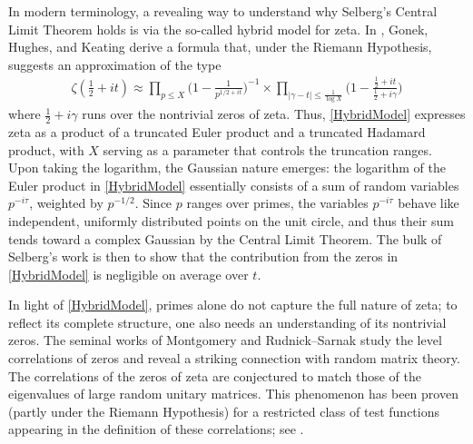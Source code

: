 \documentclass[12pt,oneside,english,a4paper]{amsart}
\theoremstyle{remark}
\numberwithin{equation}{section}
\begin{document}
In modern terminology, a revealing way to understand why Selberg's Central Limit Theorem holds is via the so-called hybrid model for zeta. In \cite{GonekHughesKeating}, Gonek, Hughes, and Keating derive a formula that, under the Riemann Hypothesis, suggests an approximation of the type
\begin{align}\label{HybridModel}
    \zeta(\tfrac12+it) \approx 
    \prod_{p\leq X} \bigg(1-\frac{1}{p^{1/2+it}} \bigg)^{-1}
    \times \prod_{|\gamma-t|\leq \frac{1}{\log X}} \bigg(1-\frac{\frac12+it}{\frac12+i\gamma}\bigg)
\end{align}
where $\frac12+i\gamma$ runs over the nontrivial zeros of zeta. Thus, \eqref{HybridModel} expresses zeta as a product of a truncated Euler product and a truncated Hadamard product, with $X$ serving as a parameter that controls the truncation ranges. Upon taking the logarithm, the Gaussian nature emerges: the logarithm of the Euler product in \eqref{HybridModel} essentially consists of a sum of random variables $p^{-i\tau}$, weighted by $p^{-1/2}$. Since $p$ ranges over primes, the variables $p^{-i\tau}$ behave like independent, uniformly distributed points on the unit circle, and thus their sum tends toward a complex Gaussian by the Central Limit Theorem. The bulk of Selberg's work is then to show that the contribution from the zeros in \eqref{HybridModel} is negligible on average over $t$.

In light of \eqref{HybridModel}, primes alone do not capture the full nature of zeta; to reflect its complete structure, one also needs an understanding of its nontrivial zeros.
The seminal works of Montgomery \cite{Montgomery1} and Rudnick–Sarnak \cite{RudnickSarnak2} study the level correlations of zeros and reveal a striking connection with random matrix theory. The correlations of the zeros of zeta are conjectured to match those of the eigenvalues of large random unitary matrices. This phenomenon has been proven (partly under the Riemann Hypothesis) for a restricted class of test functions appearing in the definition of these correlations; see \cite{Montgomery1, RudnickSarnak}.
\end{document}
